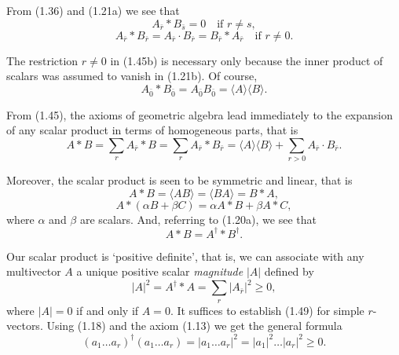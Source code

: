 \documentclass[fleqn]{scrartcl}
\numberwithin{equation}{section}
\begin{document}
\noindent From (1.36) and (1.21a) we see that
\begin{equation}
A_{\bar{r}} * B_{\bar{s}} = 0 \quad \text{if } r \neq s, \tag{1.45a}
\end{equation}
\begin{equation}
A_{\bar{r}} * B_{\bar{r}} = A_{\bar{r}} \cdot B_{\bar{r}} = B_{\bar{r}} * A_{\bar{r}} \quad \text{if } r \neq 0. \tag{1.45b}
\end{equation}

\noindent The restriction \(r \neq 0\) in (1.45b) is necessary only because the inner product of scalars was assumed to vanish in (1.21b). Of course,
\[
A_{\bar{0}} * B_{\bar{0}} = A_{\bar{0}} B_{\bar{0}} = \langle A \rangle \langle B \rangle.
\]

\noindent From (1.45), the axioms of geometric algebra lead immediately to the expansion of any scalar product in terms of homogeneous parts, that is
\begin{equation}
A * B = \sum_r A_{\bar{r}} * B = \sum_r A_{\bar{r}} * B_{\bar{r}} = \langle A \rangle \langle B \rangle + \sum_{r>0} A_{\bar{r}} \cdot B_{\bar{r}}. \tag{1.46}
\end{equation}

\noindent Moreover, the scalar product is seen to be symmetric and linear, that is
\begin{equation}
A * B = \langle AB \rangle = \langle BA \rangle = B * A, \tag{1.47a}
\end{equation}
\begin{equation}
A * (\alpha B + \beta C) = \alpha A * B + \beta A * C, \tag{1.47b}
\end{equation}
where \(\alpha\) and \(\beta\) are scalars. And, referring to (1.20a), we see that
\begin{equation}
A * B = A^{\dagger} * B^{\dagger}. \tag{1.48}
\end{equation}

\vspace{1em}
\noindent Our scalar product is `positive definite', that is, we can associate with any multivector \(A\) a unique positive scalar \textit{magnitude} \(|A|\) defined by
\begin{equation}
|A|^2 = A^{\dagger} * A = \sum_r |A_{\bar{r}}|^2 \geq 0, \tag{1.49}
\end{equation}
where \(|A| = 0\) if and only if \(A = 0\). It suffices to establish (1.49) for simple \(r\)-vectors. Using (1.18) and the axiom (1.13) we get the general formula
\begin{equation}
(a_1 \dots a_r)^{\dagger} (a_1 \dots a_r) = |a_1 \dots a_r|^2 = |a_1|^2 \dots |a_r|^2 \geq 0. \tag{1.50}
\end{equation}
\end{document}
